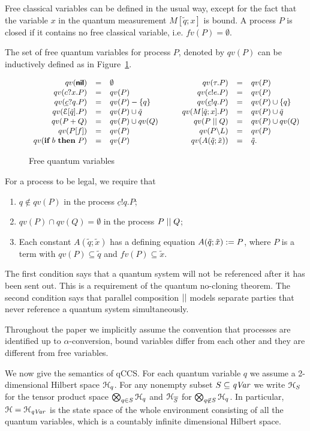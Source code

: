 \documentclass[a4paper,UKenglish,cleveref, autoref]{lipics-v2019}
\newcommand{\qc}{\underline{c}}
\newcommand{\qVar}{{\it qVar}}
\newcommand{\CE}{{\cal E}}
\newcommand{\CH}{{\cal H}}
\newcommand{\ifthen}[2]{{\textbf{if} ~#1~ \textbf{then} ~#2}}
\begin{document}
Free classical variables can be defined in the usual way, except for the fact that the variable $x$ in the quantum measurement $M[\tilde{q};x]$ is bound. A process $P$ is closed if it contains no free classical variable, i.e. $fv(P)=\emptyset$.

The set of free quantum variables for process $P$, denoted by $qv(P)$ can be inductively defined as in Figure~\ref{fig:fqv}.
\begin{figure}[t]
	\[\small\begin{array}{rclrcl}
	qv(\Cnil) & = & \emptyset & qv(\tau.P) & = & qv(P)\\
	qv(c?x.P) & = & qv(P) & qv(c!e.P) & = & qv(P) \\
	qv(\qc?q.P) & = & qv(P)-\sset{q} & qv(\qc!q.P) & = & qv(P)\cup\sset{q} \\
	qv(\CE[\tilde{q}].P) & = & qv(P)\cup \tilde{q} &
	qv(M[\tilde{q};x].P) & = & qv(P) \cup \tilde{q}\\
	qv(P+Q) & = & qv(P)\cup qv(Q) \qquad &
	qv(P \Cpar Q) & = & qv(P)\cup qv(Q)\\
	qv(P[f]) & = & qv(P) &
	qv(P\backslash L) & = & qv(P)\\
	qv(\ifthen{b}{P}) & = & qv(P) &
	qv(A(\tilde{q};\tilde{x})) & = & \tilde{q}.
	\end{array}\]
	\caption{Free quantum variables}\label{fig:fqv}
\end{figure}
For a process to be legal, we require that
\begin{enumerate}
	\item $q\not\in qv(P)$ in the process $\qc!q.P$;
	\item $qv(P)\cap qv(Q)=\emptyset$ in the process $P \mathrel{||} Q$;
	\item Each constant $A(\tilde{q};\tilde{x})$ has a defining equation $A(\tilde{q};\tilde{x}) \mathrel{:=} P$, where $P$ is a term with $qv(P)\subseteq\tilde{q}$ and $fv(P)\subseteq \tilde{x}$.
\end{enumerate}
The first condition says that a quantum system will not be referenced after it has been sent out. This is a requirement of the quantum no-cloning theorem. The second condition says that parallel composition $\mathrel{||}$ models separate parties that never reference a quantum system simultaneously. 

Throughout the paper we implicitly assume the convention that processes are identified up to $\alpha$-conversion, bound variables differ from each other and they are different from free variables.

We now give the %
semantics of qCCS. For each quantum variable $q$ we assume a 2-dimensional Hilbert space $\CH_q$. For any nonempty subset $S\subseteq \qVar$ we write $\CH_S$ for the tensor product space $\bigotimes_{q\in S}\CH_q$ and $\CH_{\overline{S}}$ for $\bigotimes_{q\not\in S}\CH_q$. In particular, $\CH=\CH_{\qVar}$ is the state space of the whole environment consisting of all the quantum variables, which is a countably infinite dimensional Hilbert space.
\end{document}
